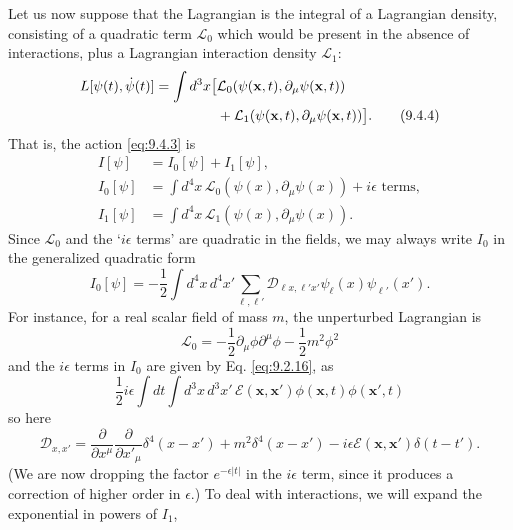 Let us now suppose that the Lagrangian is the integral of a Lagrangian density,
consisting of a quadratic term $\mathcal L_0$ which would be present in the
absence of interactions, plus a Lagrangian interaction density $\mathcal L_1$:
\begin{align}
L[\psi(t),\dot\psi(t)]=\int d^3x\bigl[&
 \mathcal L_0(\psi(\mathbf{x},t),\partial_\mu\psi(\mathbf{x},t))
\notag\\
&+\mathcal L_1(\psi(\mathbf{x},t),\partial_\mu\psi(\mathbf{x},t))\bigr].
\tag{9.4.4}\label{eq:9.4.4}
\end{align}
That is, the action \eqref{eq:9.4.3} is
\begin{align}
I[\psi]&=I_0[\psi]+I_1[\psi],
\tag{9.4.5}\label{eq:9.4.5}\\
I_0[\psi]&=\int d^4x\,
 \mathcal L_0(\psi(x),\partial_\mu\psi(x))+i\epsilon\text{ terms},
\tag{9.4.6}\label{eq:9.4.6}\\
I_1[\psi]&=\int d^4x\,
 \mathcal L_1(\psi(x),\partial_\mu\psi(x)).
\tag{9.4.7}\label{eq:9.4.7}
\end{align}
Since $\mathcal L_0$ and the `$i\epsilon$ terms' are quadratic in the fields,
we may always write $I_0$ in the generalized quadratic form
\begin{equation}
I_0[\psi]=-\frac12\int d^4x\,d^4x'\sum_{\ell,\ell'}
 \mathcal D_{\ell x,\ell'x'}\psi_\ell(x)\psi_{\ell'}(x').
\tag{9.4.8}\label{eq:9.4.8}
\end{equation}
For instance, for a real scalar field of mass $m$, the unperturbed Lagrangian
is
\begin{equation}
\mathcal L_0=-\frac12\partial_\mu\phi\partial^\mu\phi
 -\frac12m^2\phi^2
\tag{9.4.9}\label{eq:9.4.9}
\end{equation}
and the $i\epsilon$ terms in $I_0$ are given by Eq. \eqref{eq:9.2.16}, as
\begin{equation}
\frac12i\epsilon\int dt\int d^3x\,d^3x'\,
 \mathcal E(\mathbf{x},\mathbf{x}')\phi(\mathbf{x},t)\phi(\mathbf{x}',t)
\tag{9.4.10}\label{eq:9.4.10}
\end{equation}
so here
\begin{equation}
\mathcal D_{x,x'}=
 \frac{\partial}{\partial x^\mu}\frac{\partial}{\partial x'_\mu}
 \delta^4(x-x')+m^2\delta^4(x-x')
 -i\epsilon\mathcal E(\mathbf{x},\mathbf{x}')\delta(t-t').
\tag{9.4.11}\label{eq:9.4.11}
\end{equation}
(We are now dropping the factor $e^{-\epsilon|t|}$ in the $i\epsilon$ term,
since it produces a correction of higher order in $\epsilon$.) To deal with
interactions, we will expand the exponential in powers of $I_1$,
